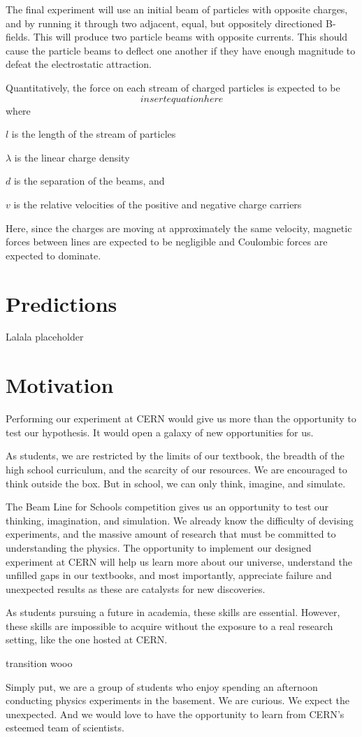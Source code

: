\documentclass[12pt,letterpaper]{article}
\begin{document}
The final experiment will use an initial beam of particles with opposite charges, and by running it through two adjacent, equal, but oppositely directioned B-fields.
This will produce two particle beams with opposite currents. 
This should cause the particle beams to deflect one another if they have enough magnitude to defeat the electrostatic attraction.

Quantitatively, the force on each stream of charged particles is expected to be \[
insert equation here
\]
where
\begin{description}
\item $l$ is the length of the stream of particles
\item $\lambda$ is the linear charge density
\item $d$ is the separation of the beams, and 
\item $v$ is the relative velocities of the positive and negative charge carriers
\end{description}
Here, since the charges are moving at approximately the same velocity, magnetic forces between lines are expected to be negligible and Coulombic forces are expected to dominate.

\section{Predictions}
Lalala placeholder

\section{Motivation}
Performing our experiment at CERN would give us more than the opportunity to test our hypothesis. It would open a galaxy of new opportunities for us.

As students, we are restricted by the limits of our textbook, the breadth of the high school curriculum, and the scarcity of our resources. We are encouraged to think outside the box. But in school, we can only think, imagine, and simulate.

The Beam Line for Schools competition gives us an opportunity to    test our thinking, imagination, and simulation. We already know the difficulty of devising experiments, and the massive amount of research that must be committed to understanding the physics. The opportunity to implement our designed experiment at CERN will help us learn more about our universe, understand the unfilled gaps in our textbooks, and most importantly, appreciate failure and unexpected results as these are catalysts for new discoveries.

As students pursuing a future in academia, these skills are essential. However, these skills are impossible to acquire without the exposure to a real research setting, like the one hosted at CERN.

transition wooo

Simply put, we are a group of students who enjoy spending an afternoon conducting physics experiments in the basement. We are curious. We expect the unexpected. And we would love to have the opportunity to learn from CERN’s esteemed team of scientists.
\end{document}

